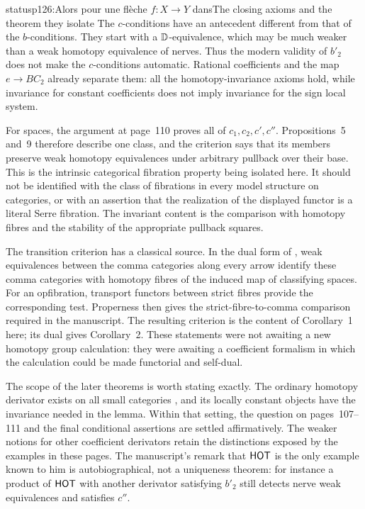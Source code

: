 \begin{dcomment}{status}{p126:Alors pour une flèche $f : X \to Y$ dans}{The closing axioms and the theorem they isolate}
The $c$-conditions have an antecedent different from that of the $b$-conditions. They start with a $\mathbb{D}$-equivalence, which may be much weaker than a weak homotopy equivalence of nerves. Thus the modern validity of $b'_2$ does not make the $c$-conditions automatic. Rational coefficients and the map $e\to BC_2$ already separate them: all the homotopy-invariance axioms hold, while invariance for constant coefficients does not imply invariance for the sign local system.

For spaces, the argument at page~110 proves all of $c_1,c_2,c',c''$. Propositions~5 and~9 therefore describe one class, and the criterion says that its members preserve weak homotopy equivalences under arbitrary pullback over their base. This is the intrinsic categorical fibration property being isolated here. It should not be identified with the class of fibrations in every model structure on categories, or with an assertion that the realization of the displayed functor is a literal Serre fibration. The invariant content is the comparison with homotopy fibres and the stability of the appropriate pullback squares.

The transition criterion has a classical source. In the dual form of \citet[\S1, Theorem~B and its corollary]{Quillen1973}, weak equivalences between the comma categories along every arrow identify these comma categories with homotopy fibres of the induced map of classifying spaces. For an opfibration, transport functors between strict fibres provide the corresponding test. Properness then gives the strict-fibre-to-comma comparison required in the manuscript. The resulting criterion is the content of Corollary~1 here; its dual gives Corollary~2. These statements were not awaiting a new homotopy group calculation: they were awaiting a coefficient formalism in which the calculation could be made functorial and self-dual.

The scope of the later theorems is worth stating exactly. The ordinary homotopy derivator exists on all small categories \citep[Theorem~6.11]{Cisinski2003}, and its locally constant objects have the invariance needed in the lemma. Within that setting, the question on pages~107--111 and the final conditional assertions are settled affirmatively. The weaker notions for other coefficient derivators retain the distinctions exposed by the examples in these pages. The manuscript's remark that $\mathsf{HOT}$ is the only example known to him is autobiographical, not a uniqueness theorem: for instance a product of $\mathsf{HOT}$ with another derivator satisfying $b'_2$ still detects nerve weak equivalences and satisfies $c''$.


\end{dcomment}
